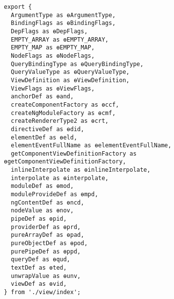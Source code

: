 \begin{verbatim}
export {
  ArgumentType as ɵArgumentType,
  BindingFlags as ɵBindingFlags,
  DepFlags as ɵDepFlags,
  EMPTY_ARRAY as ɵEMPTY_ARRAY,
  EMPTY_MAP as ɵEMPTY_MAP,
  NodeFlags as ɵNodeFlags,
  QueryBindingType as ɵQueryBindingType,
  QueryValueType as ɵQueryValueType,
  ViewDefinition as ɵViewDefinition,
  ViewFlags as ɵViewFlags,
  anchorDef as ɵand,
  createComponentFactory as ɵccf,
  createNgModuleFactory as ɵcmf,
  createRendererType2 as ɵcrt,
  directiveDef as ɵdid,
  elementDef as ɵeld,
  elementEventFullName as ɵelementEventFullName,
  getComponentViewDefinitionFactory as ɵgetComponentViewDefinitionFactory,
  inlineInterpolate as ɵinlineInterpolate,
  interpolate as ɵinterpolate,
  moduleDef as ɵmod,
  moduleProvideDef as ɵmpd,
  ngContentDef as ɵncd,
  nodeValue as ɵnov,
  pipeDef as ɵpid,
  providerDef as ɵprd,
  pureArrayDef as ɵpad,
  pureObjectDef as ɵpod,
  purePipeDef as ɵppd,
  queryDef as ɵqud,
  textDef as ɵted,
  unwrapValue as ɵunv,
  viewDef as ɵvid,
} from './view/index';
\end{verbatim}

